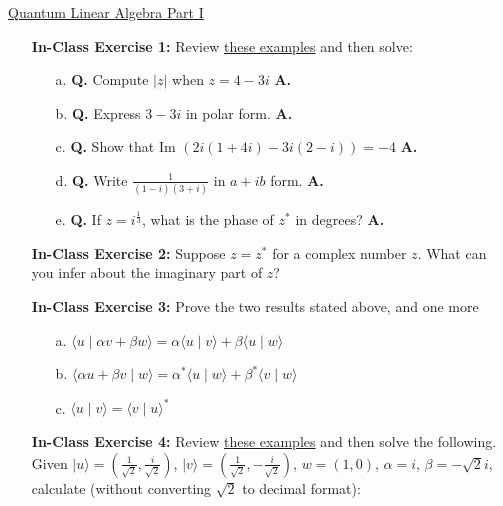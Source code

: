 \documentclass[main.tex]{subfiles}
\begin{document}
\href{https://www2.seas.gwu.edu/~simhaweb/quantum/modules/module2/module2.html}{Quantum Linear Algebra Part I}

\begin{enumerate}

\item[] \textbf{In-Class Exercise 1:} Review \href{https://www2.seas.gwu.edu/~simhaweb/quantum/modules/module2/problems2.html#complex}{these examples} and then solve:

    \begin{enumerate}
        \item[a.] \textbf{Q.} Compute $|z|$ when $z=4-3i$ \textbf{A.} 
        \item[b.] \textbf{Q.} Express $3-3 i$ in polar form. \textbf{A.}
        \item[c.] \textbf{Q.} Show that Im $(2 i(1+4 i)-3 i(2-i))=-4$ \textbf{A.}
        \item[d.] \textbf{Q.} Write $\frac{1}{(1-i)(3+i)}$ in $a+ib$ form. \textbf{A.}
        \item[e.] \textbf{Q.} If $z=i^{\frac{1}{3}}$, what is the phase of $z^{*}$ in degrees? \textbf{A.}
    \end{enumerate}

\item[] \textbf{In-Class Exercise 2:} Suppose $z=z^{*}$ for a complex number $z$. What can you infer about the imaginary part of $z$?

\item[] \textbf{In-Class Exercise 3:} Prove the two results stated above, and one more

    \begin{enumerate}
        \item[a.] $\langle u \mid \alpha v+\beta w\rangle=\alpha\langle u \mid v\rangle+\beta\langle u \mid w\rangle$
        \item[b.] $\langle\alpha u+\beta v \mid w\rangle=\alpha^{*}\langle u \mid w\rangle+\beta^{*}\langle v \mid w\rangle$
        \item[c.] $\langle u \mid v\rangle=\langle v \mid u\rangle^{*}$
    \end{enumerate}

\item[] \textbf{In-Class Exercise 4:} Review \href{https://www2.seas.gwu.edu/~simhaweb/quantum/modules/module2/problems2.html#vectors}{these examples} and then solve the following. Given $|u\rangle=\left(\frac{1}{\sqrt{2}}, \frac{i}{\sqrt{2}}\right)$, $|v\rangle=\left(\frac{1}{\sqrt{2}}, -\frac{i}{\sqrt{2}}\right)$, $w=(1,0)$, $\alpha=i$, $\beta=-\sqrt{2}i$, calculate (without converting $\sqrt{2}$ to decimal format):


\end{enumerate}
\end{document}
